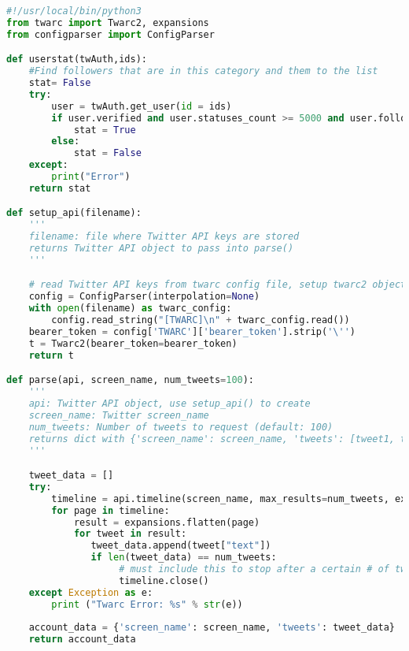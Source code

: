 \documentclass[12pt]{article}
\begin{document}
\begin{lstlisting}[language=Python, caption=tweetparser.py , label=lst:copy]
#!/usr/local/bin/python3
from twarc import Twarc2, expansions
from configparser import ConfigParser

def userstat(twAuth,ids):
    #Find followers that are in this category and them to the list
    stat= False
    try:
        user = twAuth.get_user(id = ids)
        if user.verified and user.statuses_count >= 5000 and user.followers_count >= 10000 == True:
            stat = True
        else:
            stat = False
    except:
        print("Error")
    return stat

def setup_api(filename):
    '''
    filename: file where Twitter API keys are stored
    returns Twitter API object to pass into parse()
    '''

    # read Twitter API keys from twarc config file, setup twarc2 object
    config = ConfigParser(interpolation=None)
    with open(filename) as twarc_config:
        config.read_string("[TWARC]\n" + twarc_config.read())
    bearer_token = config['TWARC']['bearer_token'].strip('\'')
    t = Twarc2(bearer_token=bearer_token)
    return t

def parse(api, screen_name, num_tweets=100):
    '''
    api: Twitter API object, use setup_api() to create
    screen_name: Twitter screen_name
    num_tweets: Number of tweets to request (default: 100)
    returns dict with {'screen_name': screen_name, 'tweets': [tweet1, tweet2, ...]}
    '''

    tweet_data = []
    try:
        timeline = api.timeline(screen_name, max_results=num_tweets, exclude_replies=True, exclude_retweets=True)
        for page in timeline:
            result = expansions.flatten(page)
            for tweet in result:
               tweet_data.append(tweet["text"])
               if len(tweet_data) == num_tweets:
                    # must include this to stop after a certain # of tweets
                    timeline.close()
    except Exception as e:
        print ("Twarc Error: %s" % str(e))
  
    account_data = {'screen_name': screen_name, 'tweets': tweet_data}
    return account_data

\end{lstlisting}
\end{document}
